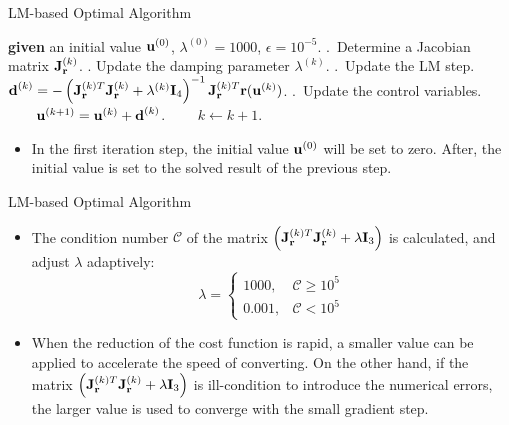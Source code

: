 \documentclass[10pt,xcolor={x11names}]{beamer}
\begin{document}
\begin{frame}{LM-based Optimal Algorithm}
    \begin{center}
        \begin{minipage}{\linewidth}
            \begin{algorithm}[H]
                \caption{LM-based Optimal Control Allocation Algorithm}\label{alg:LM}
                \begin{algorithmic}
                    \State \textbf{given} an initial value $\bm{\mathrm{u}}^{(0)}$, $\lambda^{(0)} = 1000$, $\epsilon = 10^{-5}$.
                    \Repeat
                    .~Determine a Jacobian matrix $\bm{\mathrm{J}}_{\bm{\mathrm{r}}}^{(k)}$.
                    . Update the damping parameter $\lambda^{(k)}$.
                    .~Update the LM step. 
                    \State ~~~~$\bm{\mathrm{d}}^{(k)} = -\left({\bm{\mathrm{J}}_{\bm{\mathrm{r}}}^{(k)T}} \bm{\mathrm{J}}_{\bm{\mathrm{r}}}^{(k)} +\lambda^{(k)} {\bm{\mathrm{I}}_4} \right)^{-1} \bm{\mathrm{J}}_{\bm{\mathrm{r}}}^{(k)T} \bm{\mathrm{r}}(\bm{\mathrm{u}}^{(k)})$.
                    .~Update the control variables.
                    \State ~~~~$\bm{\mathrm{u}}^{(k+1)} = \bm{\mathrm{u}}^{(k)} +\bm{\mathrm{d}}^{(k)}$.
                    \State ~~~~$k \leftarrow k+1$.
                \end{algorithmic}
            \end{algorithm}
        \end{minipage}
    \end{center}
    \begin{itemize}
        \item In the first iteration step, the initial value $\bm{\mathrm{u}}^{(0)}$ will be set to zero. After, the initial value is set to the solved result of the previous step.
    \end{itemize}
\end{frame}

\begin{frame}{LM-based Optimal Algorithm}
    \begin{itemize}
        \item The condition number $\mathcal{C}$ of the matrix $\left({\bm{\mathrm{J}}_{\bm{\mathrm{r}}}^{(k)T}} \bm{\mathrm{J}}_{\bm{\mathrm{r}}}^{(k)} +\lambda \bm{\mathrm{I}}_3\right)$ is calculated, and adjust $\lambda$ adaptively:
        \begin{equation}
            \lambda=
            \begin{cases}
                1000,  &\mathcal{C} \geq 10^5\\
                0.001, &\mathcal{C} < 10^5
            \end{cases}
        \end{equation}
        \item When the reduction of {\color{Red1}the cost function is rapid}, a {\color{Red1}smaller value} can be applied to accelerate the speed of converting. On the other hand, if the matrix $\left({\bm{\mathrm{J}}_{\bm{\mathrm{r}}}^{(k)T}} \bm{\mathrm{J}}_{\bm{\mathrm{r}}}^{(k)} +\lambda \bm{\mathrm{I}}_3\right)$ is {\color{Red1}ill-condition} to introduce the numerical errors, the {\color{Red1}larger value} is used to converge with the small gradient step.
    \end{itemize}
\end{frame}
\end{document}
